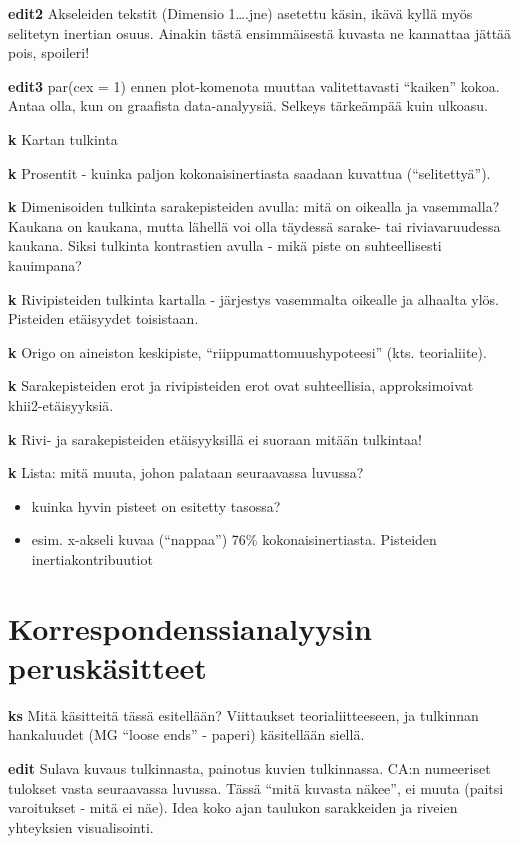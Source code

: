 \documentclass[
  finnish,
]{book}
\providecommand{\tightlist}{%
  \setlength{\itemsep}{0pt}\setlength{\parskip}{0pt}}
\begin{document}
\textbf{edit2} Akseleiden tekstit (Dimensio 1\ldots.jne) asetettu käsin,
ikävä kyllä myös selitetyn inertian osuus. Ainakin tästä ensimmäisestä
kuvasta ne kannattaa jättää pois, spoileri!

\textbf{edit3} par(cex = 1) ennen plot-komenota muuttaa valitettavasti
``kaiken'' kokoa. Antaa olla, kun on graafista data-analyysiä. Selkeys
tärkeämpää kuin ulkoasu.

\textbf{k} Kartan tulkinta

\textbf{k} Prosentit - kuinka paljon kokonaisinertiasta saadaan kuvattua
(``selitettyä'').

\textbf{k} Dimenisoiden tulkinta sarakepisteiden avulla: mitä on
oikealla ja vasemmalla? Kaukana on kaukana, mutta lähellä voi olla
täydessä sarake- tai riviavaruudessa kaukana. Siksi tulkinta kontrastien
avulla - mikä piste on suhteellisesti kauimpana?

\textbf{k} Rivipisteiden tulkinta kartalla - järjestys vasemmalta
oikealle ja alhaalta ylös. Pisteiden etäisyydet toisistaan.

\textbf{k} Origo on aineiston keskipiste, ``riippumattomuushypoteesi''
(kts. teorialiite).

\textbf{k} Sarakepisteiden erot ja rivipisteiden erot ovat suhteellisia,
approksimoivat khii2-etäisyyksiä.

\textbf{k} Rivi- ja sarakepisteiden etäisyyksillä ei suoraan mitään
tulkintaa!

\textbf{k} Lista: mitä muuta, johon palataan seuraavassa luvussa?

\begin{itemize}
\tightlist
\item
  kuinka hyvin pisteet on esitetty tasossa?
\item
  esim. x-akseli kuvaa (``nappaa'') 76\% kokonaisinertiasta. Pisteiden
  inertiakontribuutiot
\end{itemize}

\hypertarget{korrespondenssianalyysin-peruskuxe4sitteet}{%
\section{Korrespondenssianalyysin
peruskäsitteet}\label{korrespondenssianalyysin-peruskuxe4sitteet}}

\textbf{ks} Mitä käsitteitä tässä esitellään? Viittaukset
teorialiitteeseen, ja tulkinnan hankaluudet (MG ``loose ends'' - paperi)
käsitellään siellä.

\textbf{edit} Sulava kuvaus tulkinnasta, painotus kuvien tulkinnassa.
CA:n numeeriset tulokset vasta seuraavassa luvussa. Tässä ``mitä kuvasta
näkee'', ei muuta (paitsi varoitukset - mitä ei näe). Idea koko ajan
taulukon sarakkeiden ja riveien yhteyksien visualisointi.
\end{document}
